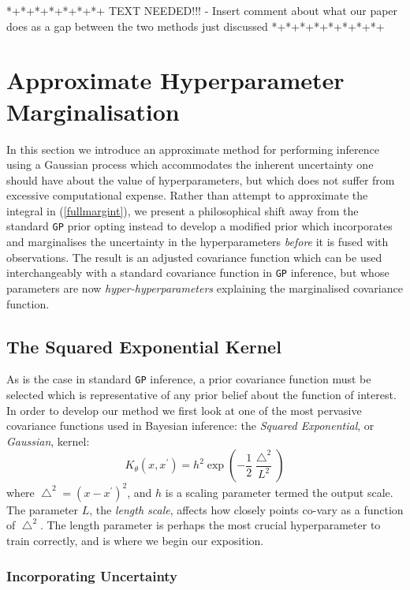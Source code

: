 \documentclass{article}
\begin{document}
*+*+*+*+*+*+*+ TEXT NEEDED!!! - Insert comment about what our paper does as a gap between the two methods just discussed *+*+*+*+*+*+*+*+

\section{Approximate Hyperparameter Marginalisation}

In this section we introduce an approximate method for performing inference using a Gaussian process which accommodates the inherent uncertainty one should have about the value of hyperparameters, but which does not suffer from excessive computational expense. Rather than attempt to approximate the integral in (\ref{fullmargint}), we present a philosophical shift away from the standard \verb"GP" prior opting instead to develop a modified prior which incorporates and marginalises the uncertainty in the hyperparameters \emph{before} it is fused with observations. The result is an adjusted covariance function which can be used interchangeably with a standard covariance function in \verb"GP" inference, but whose parameters are now \emph{hyper-hyperparameters} explaining the marginalised covariance function.

\subsection{The Squared Exponential Kernel}

As is the case in standard \verb"GP" inference, a prior covariance function must be selected which is representative of any prior belief about the function of interest. In order to develop our method we first look at one of the most pervasive covariance functions used in Bayesian inference: the \emph{Squared Exponential}, or \emph{Gaussian}, kernel:
\begin{equation}
K_\theta(x,x^\prime) = h^2 \exp \left( -\frac{1}{2} \frac{\bigtriangleup^2}{L^2} \right)
\end{equation}
where $\bigtriangleup^2 = (x - x^\prime)^2$, and $h$ is a scaling parameter termed the output scale. The parameter $L$, the \emph{length scale}, affects how closely points co-vary as a function of $\bigtriangleup^2$. The length parameter is perhaps the most crucial hyperparameter to train correctly, and is where we begin our exposition.

\subsubsection{Incorporating Uncertainty}
\end{document}
